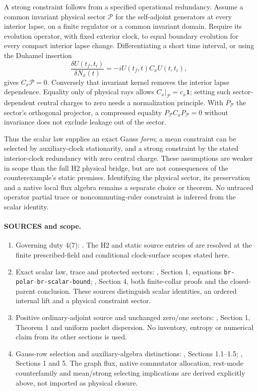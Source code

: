 \documentclass[10pt]{article}
\begin{document}
A strong constraint follows from a specified operational
redundancy. Assume a common invariant physical sector $\mathcal P$
for the self-adjoint generators at every interior lapse, on a
finite regulator or a common invariant domain. Require its
evolution operator, with fixed exterior clock, to equal boundary
evolution for every compact interior lapse change. Differentiating
a short time interval, or using the Duhamel insertion
\[
 \frac{\delta U(t_f,t_i)}{\delta N_x(t)}
       =-iU(t_f,t)C_xU(t,t_i),
\]
gives $C_x\mathcal P=0$. Conversely that invariant kernel removes
the interior lapse dependence. Equality only of physical rays
allows $C_x|_{\mathcal P}=c_x\mathbf1$; setting such sector-dependent
central charges to zero needs a normalization principle. With
$P_{\mathcal P}$ the sector's orthogonal projector, a compressed
equality $P_{\mathcal P}C_xP_{\mathcal P}=0$ without invariance
does not exclude leakage out of the sector.

Thus the scalar law supplies an exact Gauss \emph{form}; a mean
constraint can be selected by auxiliary-clock stationarity, and a
strong constraint by the stated interior-clock redundancy with
zero central charge. These assumptions are weaker in scope than
the full H2 physical bridge, but are not consequences of the
counterexample's static premises. Identifying the physical sector,
its preservation and a native local flux algebra remains a
separate choice or theorem. No untraced operator partial trace or
noncommuting-ruler constraint is inferred from the scalar identity.

\paragraph{SOURCES and scope.}
\begin{enumerate}
\item Governing duty 4(7):
.
The H2 and static source entries of
are resolved at the finite prescribed-field and conditional
clock-surface scopes stated here.
\item Exact scalar law, trace and protected sectors:
,
Section 1, equations \texttt{br-polar}--\texttt{br-scalar-bound};
,
Section 4, both finite-collar proofs and the closed-parent conclusion.
These sources distinguish scalar identities, an ordered internal
lift and a physical constraint sector.
\item Positive ordinary-adjoint source and unchanged zero/one sectors:
,
Section 1, Theorem 1 and uniform packet dispersion. No inventory,
entropy or numerical claim from its other sections is used.
\item Gauss-row selection and auxiliary-algebra distinctions:
,
Sections 1.1--1.5;
,
Sections 1 and 5. The graph flux, native commutator allocation,
rest-mode counterfamily and mean/strong selecting implications
are derived explicitly above, not imported as physical closure.
\end{enumerate}
\end{document}
